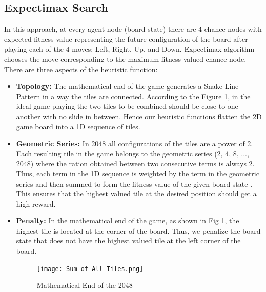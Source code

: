 \documentclass{svproc}
\begin{document}


    \subsection{Expectimax Search}

    In this approach, at every agent node (board state) there are 4 chance nodes with expected fitness value representing the future configuration of the board after playing each of the 4 moves: Left, Right, Up, and Down. Expectimax algorithm chooses the move corresponding to the maximum fitness valued chance node. There are three aspects of the heuristic function:
    \newline
    \begin{itemize}
        \item \textbf{Topology:} The mathematical end of the game generates a Snake-Line Pattern \cite{blog_maths_2048} in a way the tiles are connected. According to the Figure \ref{cMathematical_End_of_2048}, in the ideal game playing the two tiles to be combined should be close to one another with no slide in between. Hence our heuristic functions flatten the 2D game board into a 1D sequence of tiles.

        \item \textbf{Geometric Series:} In 2048 all configurations of the tiles are a power of 2. Each resulting tile in the game belongs to the geometric series (2, 4, 8, ..., 2048) where the ration obtained between two consecutive terms is always 2. Thus, each term in the 1D sequence is weighted by the term in the geometric series and then summed to form the fitness value of the given board state \cite{blog_optimum_2048,blog_maths_2048,gjdanis}. This ensures that the highest valued tile at the desired position should get a high reward.

        \item \textbf{Penalty:} In the mathematical end of the game, as shown in Fig \ref{cMathematical_End_of_2048}, the highest tile is located at the corner of the board. Thus, we penalize the board state that does not have the highest valued tile at the left corner of the board.

        \begin{figure}[h!]

            \centering
            \texttt{[image: Sum-of-All-Tiles.png]}
            \caption{Mathematical End of the 2048}
            \label{cMathematical_End_of_2048}
        \end{figure}

    \end{itemize}
\end{document}
